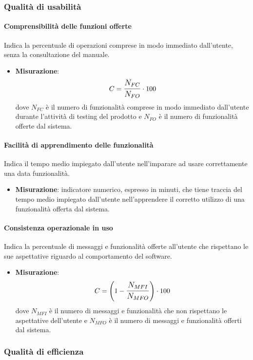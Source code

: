 \subsubsection{Qualità di usabilità}
\paragraph{Comprensibilità delle funzioni offerte}
Indica la percentuale di operazioni comprese in modo immediato dall'utente, senza la consultazione del manuale.
\begin{itemize}
	\item \textbf{Misurazione}: 
		$$C=\mathlarger{\frac{N_{FC}}{N_{FO}}} \cdot 100$$
	dove $N_{FC}$ è il numero di funzionalità comprese in modo immediato dall'utente durante l'attività di testing del prodotto e $N_{FO}$ è il numero di funzionalità offerte dal sistema.
\end{itemize}

\paragraph{Facilità di apprendimento delle funzionalità}
Indica il tempo medio impiegato dall'utente nell'imparare ad usare correttamente una data funzionalità.
\begin{itemize}
	\item \textbf{Misurazione}: indicatore numerico, espresso in minuti, che tiene traccia del tempo medio impiegato dall'utente nell'apprendere il corretto utilizzo di una funzionalità offerta dal sistema.
\end{itemize}

\paragraph{Consistenza operazionale in uso}
Indica la percentuale di messaggi e funzionalità offerte all'utente che rispettano le sue aspettative riguardo al comportamento del software.
\begin{itemize}
	\item \textbf{Misurazione}: 
		$$C=\left(1-\mathlarger{\frac{N_{MFI}}{N_{MFO}}}\right) \cdot 100$$
	dove $N_{MFI}$ è il numero di messaggi e funzionalità che non rispettano le aspettative dell'utente e $N_{MFO}$ è il numero di messaggi e funzionalità offerti dal sistema.
\end{itemize}

\subsubsection{Qualità di efficienza}


